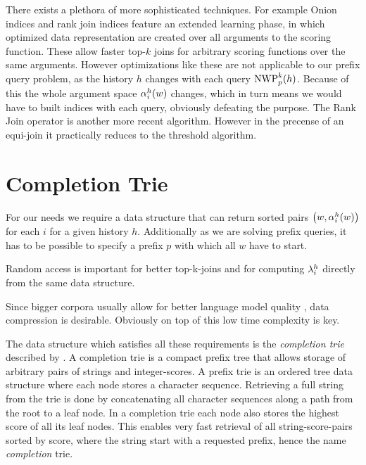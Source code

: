 There exists a plethora of more sophisticated techniques.
For example Onion indices \parencite{Chang2000} and rank join indices
\parencite{Tsaparas2003} feature an extended learning phase, in which
optimized data representation are created over all arguments to the scoring
function.
These allow faster top-$k$ joins for arbitrary scoring functions over the same
arguments.
However optimizations like these are not applicable to our prefix query problem,
as the history $h$ changes with each query $\NWP[p][k](h)$.
Because of this the whole argument space $\alpha^h_i(w)$ changes, which in turn
means we would have to built indices with each query, obviously defeating the
purpose.
The Rank Join operator \parencite{Ilyas2004} is another more recent algorithm.
However in the precense of an equi-join it practically reduces to the threshold
algorithm.

\section{Completion Trie}
\label{sec:completiontrie}

For our needs we require a data structure that can return sorted pairs
$\left(w, \alpha^h_i(w)\right)$ for each $i$ for a given history $h$.
Additionally as we are solving prefix queries, it has to be possible to specify
a prefix $p$ with which all $w$ have to start.

\begin{draft}
Random access is important for better top-k-joins and for computing
$\lambda^h_i$ directly from the same data structure.
\end{draft}

\begin{draft}
Since bigger corpora usually allow for better language model quality \noref,
data compression is desirable.
Obviously on top of this low time complexity is key.
\end{draft}

The data structure which satisfies all these requirements is the
\emph{completion trie} described by \textcite{HsuOttaviano2013}.
A completion trie is a compact prefix tree that allows storage of arbitrary
pairs of strings and integer-scores.
A prefix trie is an ordered tree data structure where each node stores a
character sequence.
Retrieving a full string from the trie is done by concatenating all character
sequences along a path from the root to a leaf node.
In a completion trie each node also stores the highest score of all its leaf
nodes.
This enables very fast retrieval of all string-score-pairs sorted by score,
where the string start with a requested prefix, hence the name
\emph{completion} trie.

